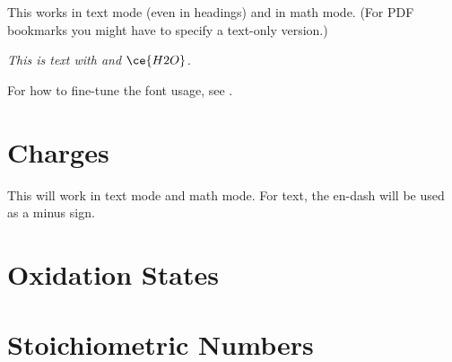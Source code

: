 \documentclass[a4paper,notitlepage,parskip=half]{scrreprt}
\begin{document}
This works in text mode (even in headings) and in math mode. (For PDF bookmarks you might have to specify a text-only version.)

{
\let\sffamilyorig\sffamily
\def\sffamily{\color{mhchem}\sffamilyorig}
\begin{SideBySideExample}[xrightmargin=5cm]
  \sffamily\itshape
  This is text with  and $\ce{H2O}$.
\end{SideBySideExample}
}

For how to fine-tune the font usage, see .


\section{Charges}

\begin{SideBySideExample}[xrightmargin=2.5cm]
\end{SideBySideExample}

\begin{SideBySideExample}[xrightmargin=2.5cm]
\end{SideBySideExample}

\begin{SideBySideExample}[xrightmargin=2.5cm]
  \ce{[AgCl2]-}
\end{SideBySideExample}

\begin{SideBySideExample}[xrightmargin=2.5cm]
\end{SideBySideExample}

\begin{SideBySideExample}[xrightmargin=2.5cm]
\end{SideBySideExample}

This will work in text mode and math mode. For text, the en-dash will be used as a minus sign.


\section{Oxidation States}

\begin{SideBySideExample}[xrightmargin=2.5cm]
\end{SideBySideExample}

\section{Stoichiometric Numbers}
\end{document}
